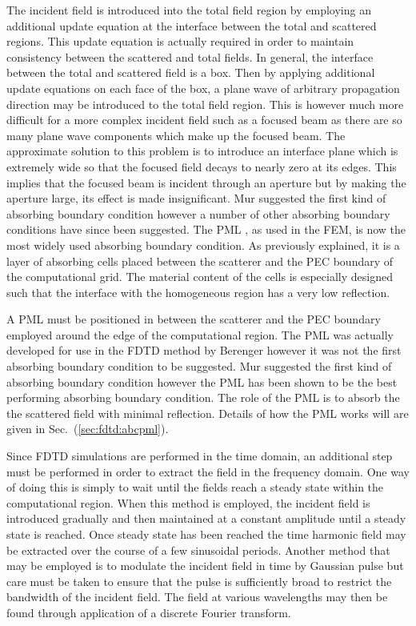 \documentclass[a4paper, 12pt]{article}
\newcommand{\sect}[1]{Sec.\ (\ref{#1})}
\begin{document}
	The incident
	field is introduced into the total field region by employing an
	additional update equation at the interface between the total and
	scattered regions. This update equation is actually required in order
	to maintain consistency between the scattered and total fields. In
	general, the interface between the total and scattered field is
	a box. Then by applying additional update equations on each face
	of the box, a plane wave of arbitrary propagation direction may be
	introduced to the total field region. This is however much more
	difficult for a more complex incident field such as a focused beam as
	there are so many plane wave components which make up the focused
	beam. The approximate solution to this problem is to introduce an
	interface plane which is extremely wide so that the focused field
	decays to nearly zero at its edges. This implies that the focused
	beam is incident through an aperture but by making the aperture large,
	its effect is made insignificant. Mur \cite{mur81ieeetransemc377} suggested the first kind of absorbing boundary
	condition however a number of other absorbing boundary conditions have
	since been suggested. The PML \cite{berenger94journcopmphys185}, as
	used in the FEM, is now the most widely used absorbing boundary
	condition. As previously explained, it is a layer of absorbing cells
	placed between the scatterer and the PEC boundary of the computational
	grid. The material content of the cells is especially designed such
	that the interface with the homogeneous region has a very low
	reflection.

	A PML must be positioned in between the
	scatterer and the PEC boundary employed around the edge of the
	computational region. The PML was actually developed for use in the
	FDTD method by Berenger \cite{berenger94journcopmphys185} however it
	was not the first absorbing boundary condition to be suggested. Mur
	\cite{mur81ieeetransemc377} suggested the first kind of absorbing boundary
	condition however the PML has been shown to be the best performing
	absorbing boundary condition. The role of the PML is to absorb the the
	scattered field with minimal reflection. Details of how the PML works
	will are given in \sect{sec:fdtd:abcpml}.

	Since FDTD simulations are performed in the time domain, an additional
	step must be performed in order to extract the field in the frequency
	domain. One way of doing this is simply to wait until the fields reach
	a steady state within the computational region. When this method is
	employed, the incident field is introduced gradually and then
	maintained at a constant amplitude until a steady state is
	reached. Once steady state has been reached the time harmonic field
	may be extracted over the course of a few sinusoidal periods. Another
	method that may be employed is to modulate the incident field in time
	by Gaussian pulse but care must be taken to ensure that the pulse is
	sufficiently broad to restrict the bandwidth of the incident
	field. The field at various wavelengths may then be found through
	application of a discrete Fourier transform.
\end{document}
